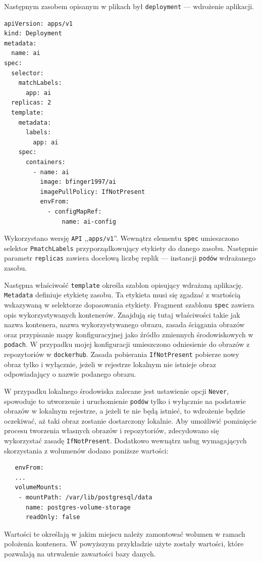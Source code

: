 \documentclass[12pt,twoside]{article}
\begin{document}
Następnym zasobem opisanym w plikach był \texttt{deployment} — wdrożenie aplikacji.
\begin{lstlisting}
apiVersion: apps/v1
kind: Deployment
metadata:
  name: ai
spec:
  selector:
    matchLabels:
      app: ai
  replicas: 2
  template:
    metadata:
      labels:
        app: ai
    spec:
      containers:
        - name: ai
          image: bfinger1997/ai
          imagePullPolicy: IfNotPresent
          envFrom:
            - configMapRef:
                name: ai-config
\end{lstlisting}
Wykorzystano wersję \texttt{API} ,,\texttt{apps/v1}''. Wewnątrz elementu \texttt{spec} umieszczono selektor \texttt{PmatchLabels} przyporządkowujący etykiety do danego zasobu. Następnie parametr \texttt{replicas} zawiera docelową liczbę replik — instancji \texttt{podów} wdrażanego zasobu.

Następna właściwość \texttt{template} określa szablon opisujący wdrażaną aplikację. \texttt{Metadata} definiuje etykietę zasobu. Ta etykieta musi się zgadzać z wartością wskazywaną w selektorze dopasowania etykiety.
Fragment szablonu \texttt{spec} zawiera opis wykorzystywanych kontenerów. Znajdują się tutaj właściwości takie jak nazwa kontenera, nazwa wykorzystywanego obrazu, zasada ściągania obrazów oraz przypisanie mapy konfiguracyjnej jako źródło zmiennych środowiskowych w \texttt{podach}.
W przypadku mojej konfiguracji umieszczono odniesienie do obrazów z repozytoriów w \texttt{dockerhub}. Zasada pobierania \texttt{IfNotPresent} pobierze nowy obraz tylko i wyłącznie, jeżeli w rejestrze lokalnym nie istnieje obraz odpowiadający o nazwie podanego obrazu. 

W przypadku lokalnego środowiska zalecane jest ustawienie opcji \texttt{Never}, spowoduje to utworzenie i uruchomienie \texttt{podów} tylko i wyłącznie na podstawie obrazów w lokalnym rejestrze, a jeżeli te nie będą istnieć, to wdrożenie będzie oczekiwać, aż taki obraz zostanie dostarczony lokalnie. Aby umożliwić pominięcie procesu tworzenia własnych obrazów i repozytoriów, zdecydowano się wykorzystać zasadę \texttt{IfNotPresent}.
Dodatkowo wewnątrz usług wymagających skorzystania z wolumenów dodano poniższe wartości:
\begin{lstlisting}
   envFrom:
   ...
   volumeMounts:
    - mountPath: /var/lib/postgresql/data
      name: postgres-volume-storage
      readOnly: false
\end{lstlisting}
Wartości te określają w jakim miejscu należy zamontować wolumen w ramach położenia kontenera. W powyższym przykładzie użyte zostały wartości, które pozwalają na utrwalenie zawartości bazy danych.
\end{document}
